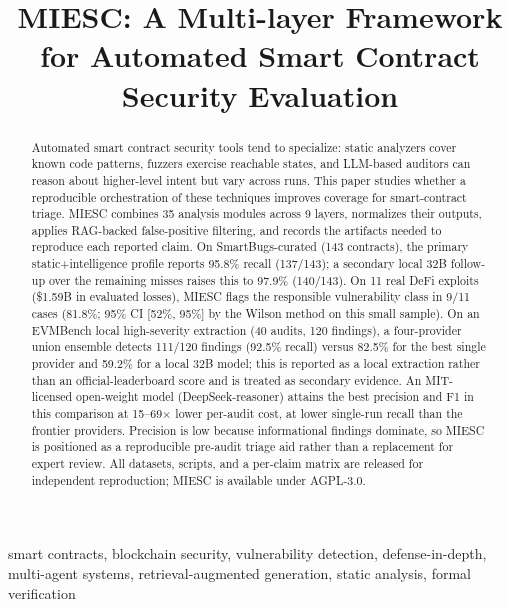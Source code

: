 \documentclass[conference]{IEEEtran}
\begin{document}
\title{MIESC: A Multi-layer Framework for Automated Smart Contract Security Evaluation}

\author{
}

\maketitle

\begin{abstract}
Automated smart contract security tools tend to specialize: static analyzers cover known code patterns, fuzzers exercise reachable states, and LLM-based auditors can reason about higher-level intent but vary across runs. This paper studies whether a reproducible orchestration of these techniques improves coverage for smart-contract triage. MIESC combines 35 analysis modules across 9 layers, normalizes their outputs, applies RAG-backed false-positive filtering, and records the artifacts needed to reproduce each reported claim. On SmartBugs-curated (143 contracts), the primary static+intelligence profile reports 95.8\% recall (137/143); a secondary local 32B follow-up over the remaining misses raises this to 97.9\% (140/143). On 11 real DeFi exploits (\$1.59B in evaluated losses), MIESC flags the responsible vulnerability class in 9/11 cases (81.8\%; 95\% CI [52\%, 95\%] by the Wilson method on this small sample). On an EVMBench local high-severity extraction (40 audits, 120 findings), a four-provider union ensemble detects 111/120 findings (92.5\% recall) versus 82.5\% for the best single provider and 59.2\% for a local 32B model; this is reported as a local extraction rather than an official-leaderboard score and is treated as secondary evidence. An MIT-licensed open-weight model (DeepSeek-reasoner) attains the best precision and F1 in this comparison at 15--69$\times$ lower per-audit cost, at lower single-run recall than the frontier providers. Precision is low because informational findings dominate, so MIESC is positioned as a reproducible pre-audit triage aid rather than a replacement for expert review. All datasets, scripts, and a per-claim matrix are released for independent reproduction; MIESC is available under AGPL-3.0.
\end{abstract}

\begin{IEEEkeywords}
smart contracts, blockchain security, vulnerability detection, defense-in-depth, multi-agent systems, retrieval-augmented generation, static analysis, formal verification
\end{IEEEkeywords}
\end{document}
